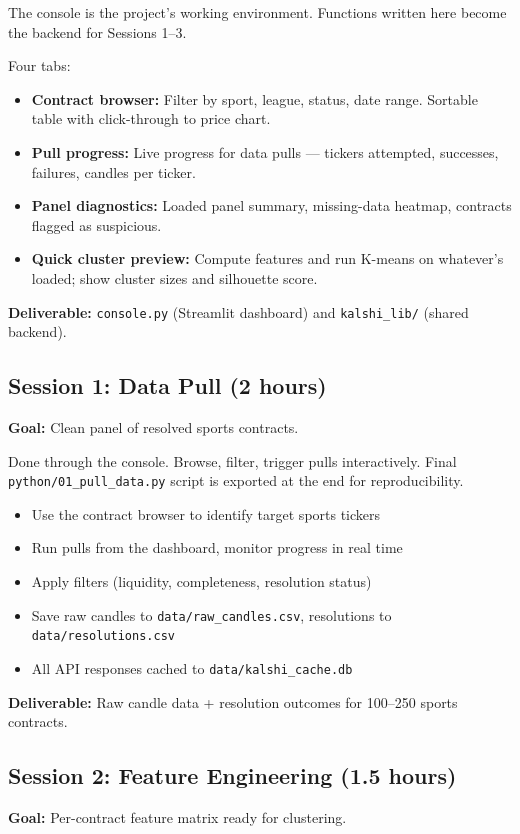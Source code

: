 \documentclass[11pt]{article}
\begin{document}
The console is the project's working environment. Functions written here become the backend for Sessions 1--3.

Four tabs:
\begin{itemize}[leftmargin=*, itemsep=0pt]
    \item \textbf{Contract browser:} Filter by sport, league, status, date range. Sortable table with click-through to price chart.
    \item \textbf{Pull progress:} Live progress for data pulls --- tickers attempted, successes, failures, candles per ticker.
    \item \textbf{Panel diagnostics:} Loaded panel summary, missing-data heatmap, contracts flagged as suspicious.
    \item \textbf{Quick cluster preview:} Compute features and run K-means on whatever's loaded; show cluster sizes and silhouette score.
\end{itemize}

\textbf{Deliverable:} \texttt{console.py} (Streamlit dashboard) and \texttt{kalshi\_lib/} (shared backend).

\subsection*{Session 1: Data Pull (2 hours)}
\textbf{Goal:} Clean panel of resolved sports contracts.

Done through the console. Browse, filter, trigger pulls interactively. Final \texttt{python/01\_pull\_data.py} script is exported at the end for reproducibility.

\begin{itemize}[leftmargin=*, itemsep=0pt]
    \item Use the contract browser to identify target sports tickers
    \item Run pulls from the dashboard, monitor progress in real time
    \item Apply filters (liquidity, completeness, resolution status)
    \item Save raw candles to \texttt{data/raw\_candles.csv}, resolutions to \texttt{data/resolutions.csv}
    \item All API responses cached to \texttt{data/kalshi\_cache.db}
\end{itemize}
\textbf{Deliverable:} Raw candle data + resolution outcomes for 100--250 sports contracts.

\subsection*{Session 2: Feature Engineering (1.5 hours)}
\textbf{Goal:} Per-contract feature matrix ready for clustering.
\end{document}
